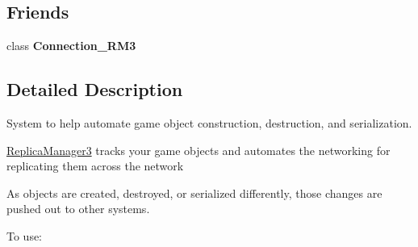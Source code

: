 \subsection*{Friends}
\begin{DoxyCompactItemize}
\item 
\hypertarget{class_rak_net_1_1_replica_manager3_ad021f0b161c282aca0b647bdd5ef9bb5}{class {\bfseries Connection\-\_\-\-R\-M3}}\label{class_rak_net_1_1_replica_manager3_ad021f0b161c282aca0b647bdd5ef9bb5}

\end{DoxyCompactItemize}


\subsection{Detailed Description}
System to help automate game object construction, destruction, and serialization. 

\hyperlink{class_rak_net_1_1_replica_manager3}{Replica\-Manager3} tracks your game objects and automates the networking for replicating them across the network\par
 As objects are created, destroyed, or serialized differently, those changes are pushed out to other systems.\par
 To use\-:\par
 
